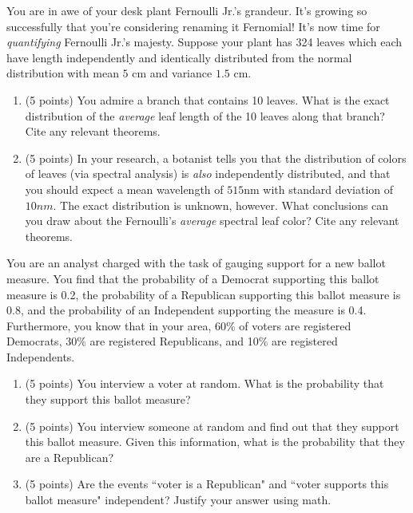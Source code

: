 \documentclass[addpoints]{exam}
\begin{document}
{\begin{questions}
\question[10] You are in awe of your desk plant Fernoulli Jr.'s grandeur.  It's growing so successfully that you're considering renaming it Fernomial!  It's now time for \textit{quantifying} Fernoulli Jr.'s majesty.  Suppose your plant has 324 leaves which each have length independently and identically distributed from the normal distribution with mean $5$ cm and variance $1.5$ cm.
	\begin{enumerate}[label=(\alph*)]
		\item (5 points) You admire a branch that contains 10 leaves.  What is the exact distribution of the \textit{average} leaf length of the 10 leaves along that branch?  Cite any relevant theorems.

		\item (5 points) In your research, a botanist tells you that the distribution of colors of leaves (via spectral analysis) is \textit{also} independently distributed, and that you should expect a mean wavelength of $515$nm with standard deviation of $10nm$.  The exact distribution is unknown, however.  What conclusions can you draw about the Fernoulli's \textit{average} spectral leaf color?  Cite any relevant theorems.
	\end{enumerate}
\clearpage

\question[15] You are an analyst charged with the task of gauging support for a new ballot measure. You find that the probability of a Democrat supporting this ballot measure is 0.2, the probability of a Republican supporting this ballot measure is 0.8, and the probability of an Independent supporting the measure is 0.4. Furthermore, you know that in your area, 60\% of voters are registered Democrats, 30\% are registered Republicans, and 10\% are registered Independents.
	\begin{enumerate}[label=(\alph*)]
		\item (5 points) You interview a voter at random. What is the probability that they support this ballot measure?
		\item (5 points) You interview someone at random and find out that they support this ballot measure. Given this information, what is the probability that they are a Republican?
		\item (5 points) Are the events ``voter is a Republican" and ``voter supports this ballot measure" independent? Justify your answer using math.
	\end{enumerate}


\end{questions}}
\end{document}
